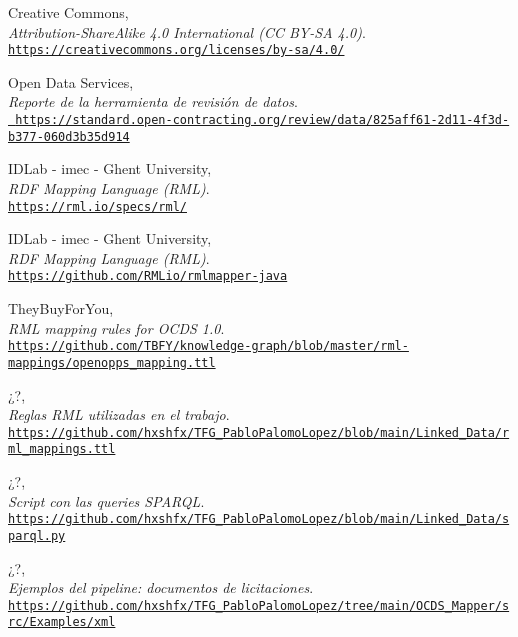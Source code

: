 \begin{thebibliography}{X}
            Creative Commons,
            \\ \textit{Attribution-ShareAlike 4.0 International (CC BY-SA 4.0)}.
            \\ \texttt{\url{https://creativecommons.org/licenses/by-sa/4.0/}}
            
            Open Data Services,
            \\ \textit{Reporte de la herramienta de revisión de datos}.
            \\ \texttt{\url{ https://standard.open-contracting.org/review/data/825aff61-2d11-4f3d-b377-060d3b35d914}}
            
            IDLab - imec - Ghent University,
            \\ \textit{RDF Mapping Language (RML)}.
            \\ \texttt{\url{https://rml.io/specs/rml/}}
            
            IDLab - imec - Ghent University,
            \\ \textit{RDF Mapping Language (RML)}.
            \\ \texttt{\url{https://github.com/RMLio/rmlmapper-java}}
            
            TheyBuyForYou,
            \\ \textit{RML mapping rules for OCDS 1.0}.
            \\ \texttt{\url{https://github.com/TBFY/knowledge-graph/blob/master/rml-mappings/openopps\_mapping.ttl}}
            
            ¿?,
            \\ \textit{Reglas RML utilizadas en el trabajo}.
            \\ \texttt{\url{https://github.com/hxshfx/TFG_PabloPalomoLopez/blob/main/Linked_Data/rml_mappings.ttl}}
        
            ¿?,
            \\ \textit{Script con las queries SPARQL}.
            \\ \texttt{\url{https://github.com/hxshfx/TFG_PabloPalomoLopez/blob/main/Linked_Data/sparql.py}}
        
            ¿?,
            \\ \textit{Ejemplos del pipeline: documentos de licitaciones}.
            \\ \texttt{\url{https://github.com/hxshfx/TFG_PabloPalomoLopez/tree/main/OCDS_Mapper/src/Examples/xml}}
            

\end{thebibliography}
